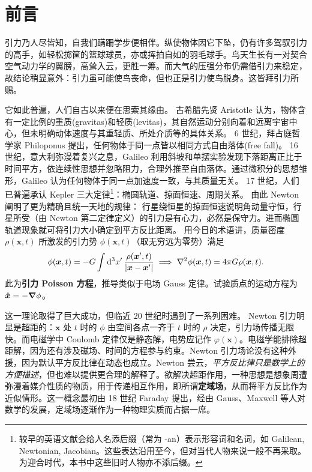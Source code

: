 \chapter*{前言}

引力乃人尽皆知，自我们蹒跚学步便相伴。纵使物体因它下坠，仍有许多驾驭引力的高手，如轻松掷筐的篮球球员，亦或挥拍自如的羽毛球手。鸟天生长有一对契合空气动力学的翼膀，高耸入云，更胜一筹。而大气的压强分布仍需借引力来稳定，故结论稍显意外：引力虽可能使鸟丧命，但也正是引力使鸟脱身。这皆拜引力所赐。

它如此普遍，人们自古以来便在思索其缘由。
古希腊先贤 Aristotle 认为，物体含有一定比例的重质(gravitas)和轻质(levitas)，其自然运动分别向着和远离宇宙中心，但未明确动体速度与其重轻质、所处介质等的具体关系。
6 世纪，拜占庭哲学家 Philoponus 提出，任何物体于同一点皆以相同方式自由落体(free fall)。
16 世纪，意大利弥漫着复兴之息，Galileo 利用斜坡和单摆实验发现下落距离正比于时间平方，依连续性思想并忽略阻力，合理外推至自由落体。通过微积分的思想雏形，Galileo 认为任何物体于同一点加速度一致，与其质量无关。
17 世纪，人们已普遍承认 Kepler 三大定律\footnote{较早的英语文献会给人名添后缀（常为 -an）表示形容词和名词，如 Galilean, Newtonian, Jacobian。这些表达沿用至今，但对当代人物来说一般不再采取。为迎合时代，本书中这些旧时人物亦不添后缀。}：椭圆轨道、掠面恒速、周期关系。
由此 Newton 阐明了更为精确且统一天地的规律：
行星绕恒星的掠面恒速说明角动量守恒，行星所受（由 Newton 第二定律定义）的引力是有心力，必然是保守力。进而椭圆轨道现象就可将引力大小确定到平方反比距离。
用今日的术语讲，质量密度 $\rho(\bm x,t)$ 所激发的引力势 $\phi(\bm x,t)$（取无穷远为零势）满足
\[\phi(\bm x,t)=-G\int\dd[3]{x'}\frac{\rho(\bm x',t)}{|\bm x-\bm x'|}\implies \nabla^2\phi(\bm x,t)=4\pi G \rho(\bm x,t).\]
此为\textbf{引力 Poisson 方程}，推导类似于电场 Gauss 定律。试验质点的运动方程为 $\ddot{\bm x}=-\grad\phi$。

这一理论取得了巨大成功，但临近 20 世纪时遇到了一系列困难。
Newton 引力明显是超距的：$\bm x$ 处 $t$ 时的 $\phi$ 由空间各点一齐于 $t$ 时的 $\rho$ 决定，引力场传播无限快。而电磁学中 Coulomb 定律仅是静态解，电势应记作 $\varphi(\bm x)$。电磁学能排除超距解，因为还有涉及磁场、时间的方程参与约束。Newton 引力场论没有这种外援，因为默认平方反比律在动态也成立。Newton 尝云，\textit{平方反比律只是数学上的方便描述}，但也难以提供更合理的解释了。欲解决超距作用，一种思想是想象周遭弥漫着媒介性质的物质，用于传递相互作用，即所谓\textbf{定域场}，从而将平方反比作为近似情形。这一概念最初由 18 世纪 Faraday 提出，经由 Gauss、Maxwell 等人对数学的发展，定域场逐渐作为一种物理实质而占据一席。

